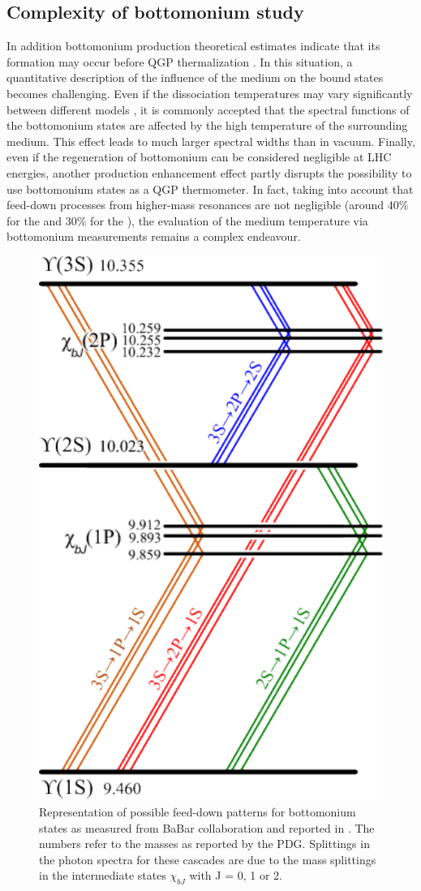 \subsection{Complexity of bottomonium study}
In addition bottomonium production theoretical estimates \cite{Krouppa:2015yoa} indicate that its formation may occur before QGP thermalization \cite{Mauricio:2007vz}. 
In this situation, a quantitative description of the influence of the medium on the bound states becomes challenging.
Even if the dissociation temperatures may vary significantly between different models \cite{Brambilla:2010cs,Andronic:2015wma}, it is commonly accepted \cite{Burnier:2014ssa} that the spectral functions of the bottomonium states are affected by the high temperature of the surrounding medium.
This effect leads to much larger spectral widths than in vacuum.
Finally, even if the regeneration of bottomonium can be considered negligible at LHC energies, another production enhancement effect partly disrupts the possibility to use bottomonium states as a QGP thermometer. 
In fact, taking into account that feed-down processes from higher-mass resonances  are not negligible (around 40\% for the \upsis and 30\% for the \upsiss \cite{Andronic:2015wma}), the evaluation of the medium temperature via bottomonium measurements remains a complex endeavour.

\begin{figure}[!t]
\begin{center}
\includegraphics[width=0.45\linewidth]{Chapters/Analysis/Figs/BottomoniumSpectro.pdf}
\caption{Representation of possible feed-down patterns for bottomonium states as measured from BaBar collaboration and reported in \cite{Lees:2014qea}. The numbers refer to the masses as reported by the PDG. Splittings in the photon spectra for these cascades are due to the mass splittings in the intermediate states $\chi_{bJ}$ with J = 0, 1 or 2.}
\label{fig:BBSpectro}
\end{center}
\end{figure}

